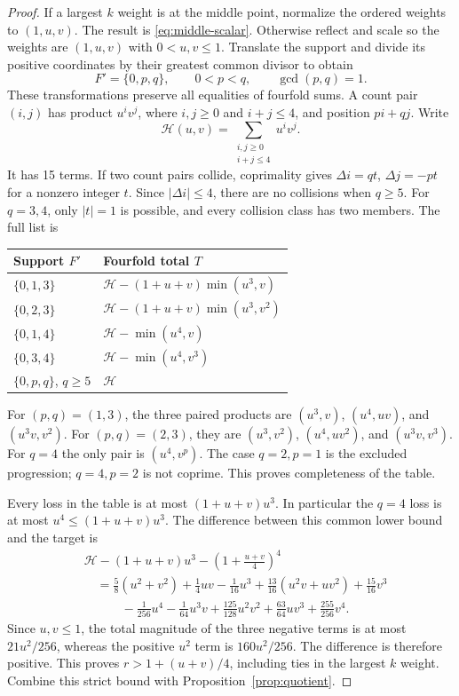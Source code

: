\documentclass[11pt,a4paper]{article}
\theoremstyle{remark}
\begin{document}
\begin{proof}
If a largest $k$ weight is at the middle point, normalize the ordered
weights to $(1,u,v)$. The result is \eqref{eq:middle-scalar}.
Otherwise reflect and scale so the weights are $(1,u,v)$ with
$0<u,v\le1$. Translate the support and divide its positive coordinates
by their greatest common divisor to obtain
\[
 F'=\{0,p,q\},\qquad 0<p<q,\qquad\gcd(p,q)=1.
\]
These transformations preserve all equalities of fourfold sums.
A count pair $(i,j)$ has product $u^iv^j$, where $i,j\ge0$ and
$i+j\le4$, and position $pi+qj$. Write
\[
 \mathcal H(u,v)=\sum_{\substack{i,j\ge0\\i+j\le4}}u^iv^j.
\]
It has 15 terms. If two count pairs collide, coprimality gives
$\Delta i=qt$, $\Delta j=-pt$ for a nonzero integer $t$.
Since $|\Delta i|\le4$, there are no collisions when $q\ge5$.
For $q=3,4$, only $|t|=1$ is possible, and every collision class
has two members. The full list is
\begin{center}
\begin{tabular}{@{}ll@{}}
\toprule
Support $F'$ & Fourfold total $T$\\
\midrule
$\{0,1,3\}$ & $\mathcal H-(1+u+v)\min(u^3,v)$\\
$\{0,2,3\}$ & $\mathcal H-(1+u+v)\min(u^3,v^2)$\\
$\{0,1,4\}$ & $\mathcal H-\min(u^4,v)$\\
$\{0,3,4\}$ & $\mathcal H-\min(u^4,v^3)$\\
$\{0,p,q\}$, $q\ge5$ & $\mathcal H$\\
\bottomrule
\end{tabular}
\end{center}
For $(p,q)=(1,3)$, the three paired products are
$(u^3,v)$, $(u^4,uv)$, and $(u^3v,v^2)$.
For $(p,q)=(2,3)$, they are
$(u^3,v^2)$, $(u^4,uv^2)$, and $(u^3v,v^3)$.
For $q=4$ the only pair is $(u^4,v^p)$.
The case $q=2,p=1$ is the excluded progression; $q=4,p=2$ is not
coprime. This proves completeness of the table.

Every loss in the table is at most $(1+u+v)u^3$. In particular the
$q=4$ loss is at most $u^4\le(1+u+v)u^3$.
The difference between this common lower bound and the target is
\begin{align*}
 &\mathcal H-(1+u+v)u^3-\left(1+\frac{u+v}{4}\right)^4\\
 &\quad=\frac58(u^2+v^2)+\frac14uv-\frac1{16}u^3
       +\frac{13}{16}(u^2v+uv^2)+\frac{15}{16}v^3\\
 &\qquad\quad-\frac1{256}u^4-\frac1{64}u^3v
       +\frac{125}{128}u^2v^2+\frac{63}{64}uv^3+\frac{255}{256}v^4.
\end{align*}
Since $u,v\le1$, the total magnitude of the three negative terms
is at most $21u^2/256$, whereas the positive $u^2$ term is
$160u^2/256$. The difference is therefore positive.
This proves $r>1+(u+v)/4$, including ties in the largest $k$ weight.
Combine this strict bound with Proposition~\ref{prop:quotient}.
\end{proof}
\end{document}
